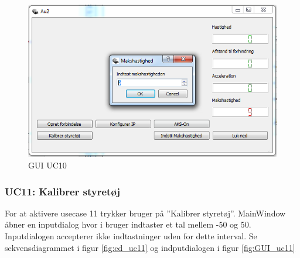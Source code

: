 \begin{figure}[H]
\centering
\includegraphics[width=\textwidth* 3/4,height=\textwidth* 9/20 ]{../fig/billeder/gui_uc10.png}
\caption{GUI UC10}
\label{fig:GUI_uc10}
\end{figure}

\subsubsection{UC11: Kalibrer styretøj}
For at aktivere usecase 11 trykker bruger på ''Kalibrer styretøj''.
MainWindow åbner en inputdialog hvor i bruger indtaster et tal mellem -50 og 50. Inputdialogen accepterer ikke indtastninger uden for dette interval. Se sekvensdiagrammet i figur \ref{fig:cd_uc11} og indputdialogen i figur \ref{fig:GUI_uc11}


